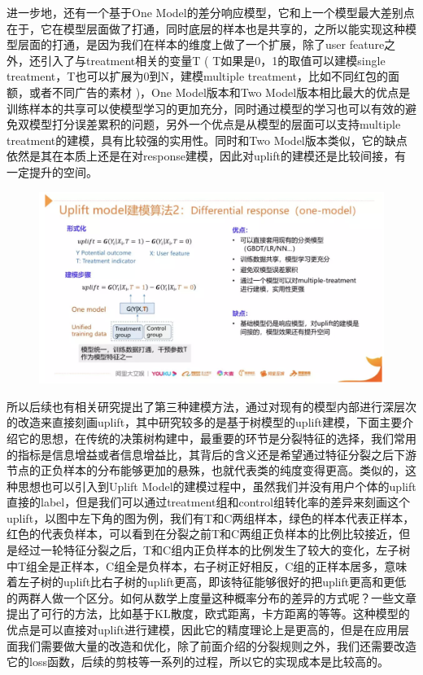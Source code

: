 \documentclass[12pt]{article}
\begin{document}
进一步地，还有一个基于One Model的差分响应模型，它和上一个模型最大差别点在于，它在模型层面做了打通，同时底层的样本也是共享的，之所以能实现这种模型层面的打通，是因为我们在样本的维度上做了一个扩展，除了user feature之外，还引入了与treatment相关的变量T ( T如果是0，1的取值可以建模single treatment，T也可以扩展为0到N，建模multiple treatment，比如不同红包的面额，或者不同广告的素材 )，One Model版本和Two Model版本相比最大的优点是训练样本的共享可以使模型学习的更加充分，同时通过模型的学习也可以有效的避免双模型打分误差累积的问题，另外一个优点是从模型的层面可以支持multiple treatment的建模，具有比较强的实用性。同时和Two Model版本类似，它的缺点依然是其在本质上还是在对response建模，因此对uplift的建模还是比较间接，有一定提升的空间。

\begin{figure}[H]
    \centering
    \includegraphics[width=1\textwidth]{fig/CasualInference-Uplift-Model-One-Model.png}
\end{figure}

所以后续也有相关研究提出了第三种建模方法，通过对现有的模型内部进行深层次的改造来直接刻画uplift，其中研究较多的是基于树模型的uplift建模，下面主要介绍它的思想，在传统的决策树构建中，最重要的环节是分裂特征的选择，我们常用的指标是信息增益或者信息增益比，其背后的含义还是希望通过特征分裂之后下游节点的正负样本的分布能够更加的悬殊，也就代表类的纯度变得更高。类似的，这种思想也可以引入到Uplift Model的建模过程中，虽然我们并没有用户个体的uplift直接的label，但是我们可以通过treatment组和control组转化率的差异来刻画这个uplift，以图中左下角的图为例，我们有T和C两组样本，绿色的样本代表正样本，红色的代表负样本，可以看到在分裂之前T和C两组正负样本的比例比较接近，但是经过一轮特征分裂之后，T和C组内正负样本的比例发生了较大的变化，左子树中T组全是正样本，C组全是负样本，右子树正好相反，C组的正样本居多，意味着左子树的uplift比右子树的uplift更高，即该特征能够很好的把uplift更高和更低的两群人做一个区分。如何从数学上度量这种概率分布的差异的方式呢？一些文章提出了可行的方法，比如基于KL散度，欧式距离，卡方距离的等等。这种模型的优点是可以直接对uplift进行建模，因此它的精度理论上是更高的，但是在应用层面我们需要做大量的改造和优化，除了前面介绍的分裂规则之外，我们还需要改造它的loss函数，后续的剪枝等一系列的过程，所以它的实现成本是比较高的。
\end{document}

